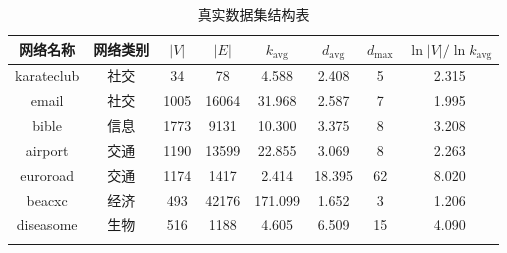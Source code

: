 \begin{table*}[hpbt]
    \centering
    \begin{tabular}{cccccccc}
    \thickhline
    网络名称 &   网络类别   & $|V|$ & $|E|$ & $k_{\mathrm{avg}}$ & $d_{\mathrm{avg}}$ &  $d_{\mathrm{max}}$ & $\ln |V|/\ln k_\mathrm{avg}$ \\
    \hline
    karateclub&   社交    &   34                  &         78            &      4.588                       &      2.408                       &         5                         &           2.315            \\
    email   &     社交    & 1005                  &      16064            &     31.968                       &      2.587                       &         7                         &           1.995            \\
    bible   &     信息    & 1773                  &       9131            &     10.300                       &      3.375                       &         8                         &           3.208            \\
    airport &     交通    & 1190                  &      13599            &     22.855                       &      3.069                       &         8                         &           2.263            \\
    euroroad&     交通    & 1174                  &       1417            &      2.414                       &     18.395                       &        62                         &           8.020            \\
    beacxc  &     经济    &  493                  &      42176            &    171.099                       &      1.652                       &         3                         &           1.206            \\
    diseasome&    生物    &  516                  &       1188            &      4.605                       &      6.509                       &        15                         &           4.090            \\
    \thickhline
    \end{tabular}
    \caption{真实数据集结构表}
    \label{table:真实数据集结构表}
\end{table*}